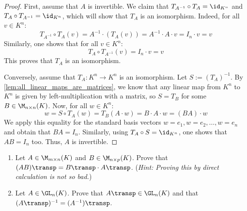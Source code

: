 \begin{proof}
First, assume that $A$ is invertible. We claim that $T_{A^{-1}} \circ T_A = \id_{K^n}$ and $T_A \circ T_{A^{-1}} = \id_{K^n}$, which will show that $T_A$ is an isomorphism. Indeed, for all $v \in K^n$:
\begin{equation*}
    T_{A^{-1}} \circ T_A(v) = A^{-1} \cdot (T_A(v)) = A^{-1} \cdot A \cdot v = I_n \cdot v = v
\end{equation*}
Similarly, one shows that for all $v \in K^n$:
\begin{equation*}
    T_A \circ T_{A^{-1}}(v) = I_n \cdot v = v
\end{equation*}
This proves that $T_A$ is an isomorphism.
 
Conversely, assume that $T_A: K^n \to K^n$ is an isomorphism. Let $S := (T_A)^{-1}$. By \cref{lem:all_linear_maps_are_matrices}, we know that any linear map from $K^n$ to $K^n$ is given by left-multiplication with a matrix, so $S = T_B$ for some $B \in \M_{n \times n}(K)$. Now, for all $w \in K^n$:
\begin{equation*}
    w = S \circ T_A(w) = T_B(A \cdot w) = B \cdot A \cdot w = (BA) \cdot w
\end{equation*}
We apply this equality for the standard basis vectors $w = e_1, w = e_2, \dots, w = e_n$ and obtain that $BA = I_n$. Similarly, using $T_A \circ S = \id_{K^n}$, one shows that $AB = I_n$ too. Thus, $A$ is invertible.
\end{proof}

\begin{exercise}
\label{exc:transpose_properties_multiplication}
\begin{enumerate}[label=\textbf{(\alph*)}]
    \item Let $A \in \M_{m \times n}(K)$ and $B \in \M_{n \times p}(K)$. Prove that $(AB)\transp = B\transp \cdot A\transp$. \newline (\textit{Hint: Proving this by direct calculation is not so bad.})
    \item Let $A \in \GL_n(K)$. Prove that $A\transp \in \GL_n(K)$ and that $(A\transp)^{-1} = (A^{-1})\transp$.
\end{enumerate}
\end{exercise}

